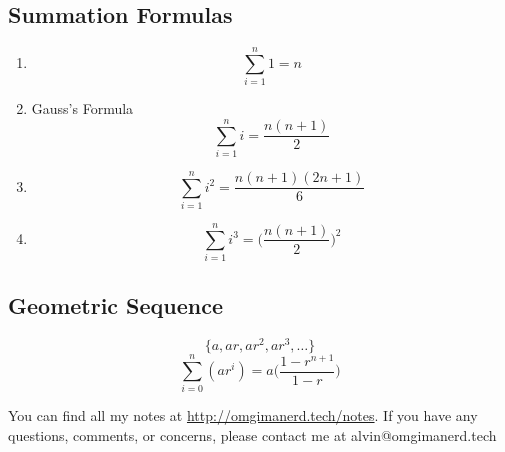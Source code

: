 \documentclass{math}
\begin{document}
\subsection*{Summation Formulas}
\begin{enumerate}
  \item
    \[ \sum_{i=1}^{n}1 = n \]
  \item Gauss's Formula
    \[ \sum_{i=1}^{n}i = \frac{n(n+1)}{2} \]
  \item
    \[ \sum_{i=1}^{n}i^{2} = \frac{n(n+1)(2n+1)}{6} \]
  \item
    \[ \sum_{i=1}^{n}i^{3} = \bigg(\frac{n(n+1)}{2}\bigg)^{2} \]
\end{enumerate}

\subsection*{Geometric Sequence}
\[ \{a,ar,ar^{2},ar^{3},\dots\} \]
\[ \sum_{i=0}^{n}(ar^{i}) = a\bigg(\frac{1-r^{n+1}}{1-r}\bigg) \]

\begin{center}
  You can find all my notes at \url{http://omgimanerd.tech/notes}. If you have
  any questions, comments, or concerns, please contact me at
  alvin@omgimanerd.tech
\end{center}
\end{document}
